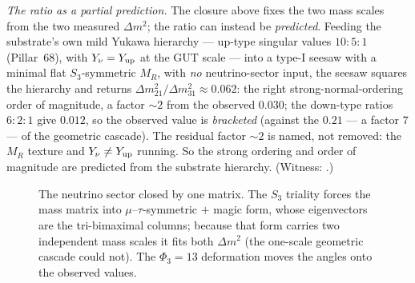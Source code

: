 \documentclass[11pt]{article}
\begin{document}
\emph{The ratio as a partial prediction.} The closure above fixes the two mass
scales from the two measured $\Delta m^2$; the ratio can instead be \emph{predicted}.
Feeding the substrate's own mild Yukawa hierarchy --- up-type singular values
$10\!:\!5\!:\!1$ (Pillar~68), with $Y_\nu=Y_{\rm up}$ at the GUT scale --- into a
type-I seesaw with a minimal flat $S_3$-symmetric $M_R$, with \emph{no}
neutrino-sector input, the seesaw squares the hierarchy and returns
$\Delta m^2_{21}/\Delta m^2_{31}\approx0.062$: the right strong-normal-ordering order
of magnitude, a factor $\sim2$ from the observed $0.030$; the down-type ratios
$6\!:\!2\!:\!1$ give $0.012$, so the observed value is \emph{bracketed} (against the
$0.21$ --- a factor $7$ --- of the geometric cascade). The residual factor $\sim2$ is
named, not removed: the $M_R$ texture and $Y_\nu\neq Y_{\rm up}$ running. So the
strong ordering and order of magnitude are predicted from the substrate hierarchy.
(Witness: .)

\begin{figure}[ht]\centering
{}
\caption{The neutrino sector closed by one matrix. The $S_3$ triality forces the
mass matrix into $\mu$--$\tau$-symmetric $+$ magic form, whose eigenvectors are the
tri-bimaximal columns; because that form carries two independent mass scales it fits
both $\Delta m^2$ (the one-scale geometric cascade could not). The $\Phi_3=13$
deformation moves the angles onto the observed values.}
\label{fig:neutrino-pinned}
\end{figure}
\end{document}
